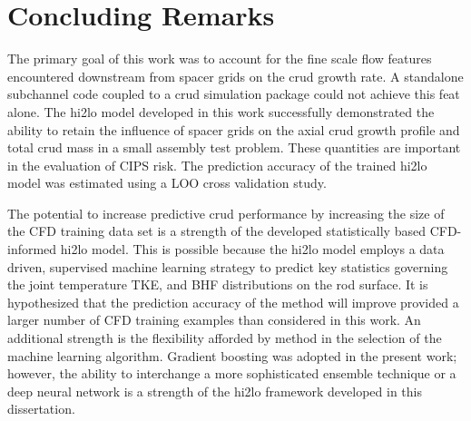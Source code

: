 
\section{Concluding Remarks}

The primary goal of this work was to account for the fine scale flow features encountered downstream from spacer grids on the crud growth rate.  A standalone subchannel code coupled to a crud simulation package could not achieve this feat alone.  The hi2lo model developed in this work successfully demonstrated the ability to retain the influence of spacer grids on the axial crud growth profile and total crud mass in a small assembly test problem.  These quantities are important in the evaluation of CIPS risk. The prediction accuracy of the trained hi2lo model was estimated using a LOO cross validation study.

The potential to increase predictive crud performance by increasing the size of the CFD training data set is a strength of the developed statistically based CFD-informed hi2lo model.  This is possible because the hi2lo model employs a data driven, supervised machine learning strategy to predict key statistics governing the joint temperature TKE, and BHF distributions on the rod surface.   It is hypothesized that the prediction accuracy of the method will improve provided a larger number of CFD training examples than considered in this work.  An additional strength is the flexibility afforded by method in the selection of the machine learning algorithm.  Gradient boosting was adopted in the present work; however, the ability to interchange a more sophisticated ensemble technique or a deep neural network is a strength of the hi2lo framework developed in this dissertation.

